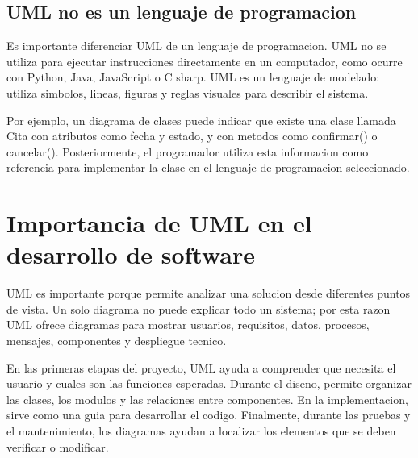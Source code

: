 \documentclass[12pt,letterpaper]{article}
\begin{document}
\subsection{UML no es un lenguaje de programacion}

Es importante diferenciar UML de un lenguaje de programacion. UML no se utiliza para ejecutar instrucciones directamente en un computador, como ocurre con Python, Java, JavaScript o C sharp. UML es un lenguaje de modelado: utiliza simbolos, lineas, figuras y reglas visuales para describir el sistema.

Por ejemplo, un diagrama de clases puede indicar que existe una clase llamada Cita con atributos como fecha y estado, y con metodos como confirmar() o cancelar(). Posteriormente, el programador utiliza esta informacion como referencia para implementar la clase en el lenguaje de programacion seleccionado.

\section{Importancia de UML en el desarrollo de software}

UML es importante porque permite analizar una solucion desde diferentes puntos de vista. Un solo diagrama no puede explicar todo un sistema; por esta razon UML ofrece diagramas para mostrar usuarios, requisitos, datos, procesos, mensajes, componentes y despliegue tecnico.

En las primeras etapas del proyecto, UML ayuda a comprender que necesita el usuario y cuales son las funciones esperadas. Durante el diseno, permite organizar las clases, los modulos y las relaciones entre componentes. En la implementacion, sirve como una guia para desarrollar el codigo. Finalmente, durante las pruebas y el mantenimiento, los diagramas ayudan a localizar los elementos que se deben verificar o modificar.
\end{document}
